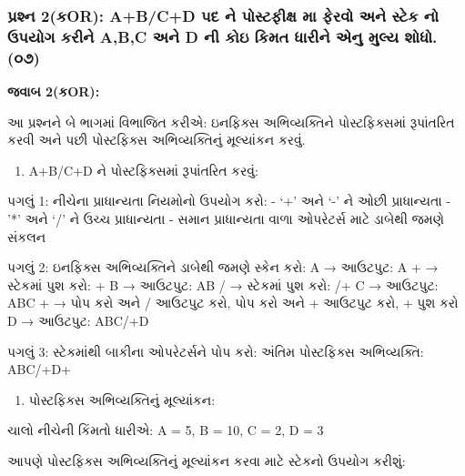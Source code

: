 \hypertarget{uxaaauxab0uxab6uxaa8-2uxa95or-abcd-uxaaauxaa6-uxaa8-uxaaauxab8uxa9fuxaabuxa95uxab7-uxaae-uxaabuxab0uxab5-uxa85uxaa8-uxab8uxa9fuxa95-uxaa8-uxa89uxaaauxaafuxa97-uxa95uxab0uxaa8-abc-uxa85uxaa8-d-uxaa8-uxa95uxa87-uxa95uxaaeuxaa4-uxaa7uxab0uxaa8-uxa8fuxaa8-uxaaeuxab2uxaaf-uxab6uxaa7.-uxae6uxaed}{%
\subsubsection{પ્રશ્ન 2(કOR): A+B/C+D પદ ને પોસ્ટફીક્ષ મા ફેરવો અને સ્ટેક નો
ઉપયોગ કરીને A,B,C અને D ની કોઇ કિમત ધારીને એનુ મુલ્ય શોધો.
(૦૭)}\label{uxaaauxab0uxab6uxaa8-2uxa95or-abcd-uxaaauxaa6-uxaa8-uxaaauxab8uxa9fuxaabuxa95uxab7-uxaae-uxaabuxab0uxab5-uxa85uxaa8-uxab8uxa9fuxa95-uxaa8-uxa89uxaaauxaafuxa97-uxa95uxab0uxaa8-abc-uxa85uxaa8-d-uxaa8-uxa95uxa87-uxa95uxaaeuxaa4-uxaa7uxab0uxaa8-uxa8fuxaa8-uxaaeuxab2uxaaf-uxab6uxaa7.-uxae6uxaed}}

\textbf{જવાબ 2(કOR):}

આ પ્રશ્નને બે ભાગમાં વિભાજિત કરીએ: ઇનફિક્સ અભિવ્યક્તિને પોસ્ટફિક્સમાં રૂપાંતરિત કરવી
અને પછી પોસ્ટફિક્સ અભિવ્યક્તિનું મૂલ્યાંકન કરવું.

\begin{enumerate}
\def\labelenumi{\arabic{enumi}.}
\tightlist
\item
  A+B/C+D ને પોસ્ટફિક્સમાં રૂપાંતરિત કરવું:
\end{enumerate}

પગલું 1: નીચેના પ્રાધાન્યતા નિયમોનો ઉપયોગ કરો: - `+' અને `-' ને ઓછી પ્રાધાન્યતા -
'*' અને `/' ને ઉચ્ચ પ્રાધાન્યતા - સમાન પ્રાધાન્યતા વાળા ઓપરેટર્સ માટે ડાબેથી જમણે
સંકલન

પગલું 2: ઇનફિક્સ અભિવ્યક્તિને ડાબેથી જમણે સ્કેન કરો: A → આઉટપુટ: A + → સ્ટેકમાં પુશ
કરો: + B → આઉટપુટ: AB / → સ્ટેકમાં પુશ કરો: /+ C → આઉટપુટ: ABC + → પોપ કરો અને
/ આઉટપુટ કરો, પોપ કરો અને + આઉટપુટ કરો, + પુશ કરો D → આઉટપુટ: ABC/+D

પગલું 3: સ્ટેકમાંથી બાકીના ઓપરેટર્સને પોપ કરો: અંતિમ પોસ્ટફિક્સ અભિવ્યક્તિ: ABC/+D+

\begin{enumerate}
\def\labelenumi{\arabic{enumi}.}
\setcounter{enumi}{1}
\tightlist
\item
  પોસ્ટફિક્સ અભિવ્યક્તિનું મૂલ્યાંકન:
\end{enumerate}

ચાલો નીચેની કિંમતો ધારીએ: A = 5, B = 10, C = 2, D = 3

આપણે પોસ્ટફિક્સ અભિવ્યક્તિનું મૂલ્યાંકન કરવા માટે સ્ટેકનો ઉપયોગ કરીશું:

